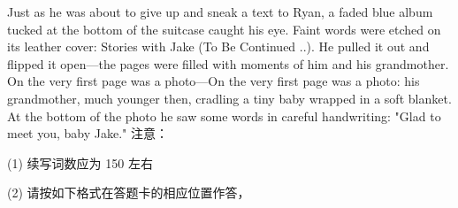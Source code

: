 \documentclass{英语试卷}
\begin{document}
\par Just as he was about to give up and sneak a text to Ryan, a faded blue album tucked at the bottom of the suitcase caught his eye. Faint words were etched on its leather cover: Stories with Jake (To Be Continued ..). He pulled it out and flipped it open—the pages were filled with moments of him and his grandmother. On the very first page was a photo—On the very first page was a photo: his grandmother, much younger then, cradling a tiny baby wrapped in a soft blanket. At the bottom of the photo he saw some words in careful handwriting: "Glad to meet you, baby Jake." 注意：\par
\par (1) 续写词数应为 150 左右\par
\par (2) 请按如下格式在答题卡的相应位置作答，\par
{}
\end{document}
